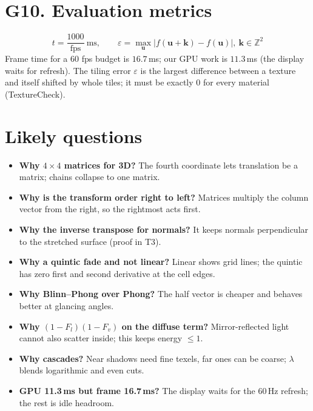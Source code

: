 \documentclass[11pt,a4paper]{article}
\begin{document}
\section{G10. Evaluation metrics}
\[t=\frac{1000}{\text{fps}}\ \text{ms},\qquad \varepsilon=\max_{\mathbf u}\left|f(\mathbf u+\mathbf k)-f(\mathbf u)\right|,\ \mathbf k\in\mathbb Z^{2}\]
Frame time for a 60 fps budget is $16.7$\,ms; our GPU work is $11.3$\,ms (the display waits for refresh). The tiling error $\varepsilon$ is the largest difference between a texture and itself shifted by whole tiles; it must be exactly $0$ for every material (TextureCheck).

\section*{Likely questions}
\begin{itemize}[leftmargin=0.25in,itemsep=1pt]
	\item \textbf{Why $4\times4$ matrices for 3D?} The fourth coordinate lets translation be a matrix; chains collapse to one matrix.
	\item \textbf{Why is the transform order right to left?} Matrices multiply the column vector from the right, so the rightmost acts first.
	\item \textbf{Why the inverse transpose for normals?} It keeps normals perpendicular to the stretched surface (proof in T3).
	\item \textbf{Why a quintic fade and not linear?} Linear shows grid lines; the quintic has zero first and second derivative at the cell edges.
	\item \textbf{Why Blinn--Phong over Phong?} The half vector is cheaper and behaves better at glancing angles.
	\item \textbf{Why $(1-F_l)(1-F_v)$ on the diffuse term?} Mirror-reflected light cannot also scatter inside; this keeps energy $\le1$.
	\item \textbf{Why cascades?} Near shadows need fine texels, far ones can be coarse; $\lambda$ blends logarithmic and even cuts.
	\item \textbf{GPU 11.3\,ms but frame 16.7\,ms?} The display waits for the 60\,Hz refresh; the rest is idle headroom.
\end{itemize}
\end{document}
